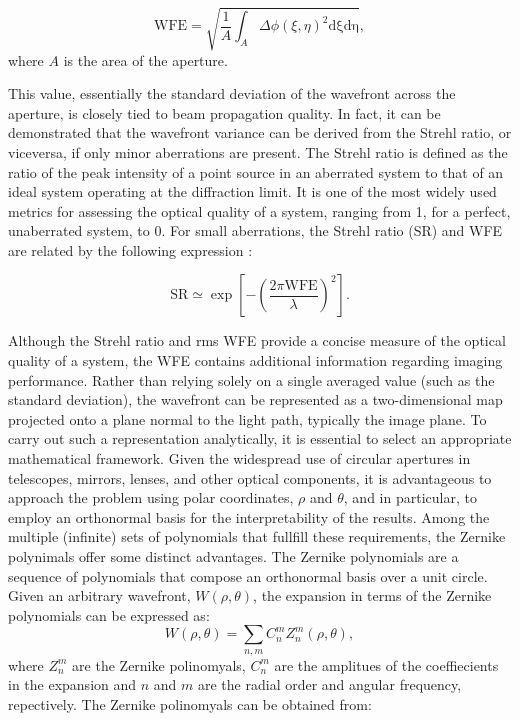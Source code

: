 \begin{equation}
  \textrm{WFE} = \sqrt{\frac{1}{A}\int _ {A} \Delta \phi  \left(\xi, \eta \right) ^2 \mathrm{d \xi}\mathrm{d \eta}},
\end{equation}
where $A$ is the area of the aperture. 

This value, essentially the standard deviation of the wavefront across the aperture, is closely tied to beam propagation quality. In fact, it can be demonstrated that the wavefront variance can be derived from the Strehl ratio, or viceversa, if only minor aberrations are present. The Strehl ratio is defined as the ratio of the peak intensity of a point source in an aberrated system to that of an ideal system operating at the diffraction limit. It is one of the most widely used metrics for assessing the optical quality of a system, ranging from 1, for a perfect, unaberrated system, to 0. For small aberrations, the Strehl ratio (SR) and WFE are related by the following expression \citep{WFE_def}: 

\begin{equation}
  \textrm{SR} \simeq \exp \left[ - \left(\frac{2\pi \textrm{WFE}}{\lambda}\right) ^2 \right].
\end{equation}

Although the Strehl ratio and rms WFE provide a concise measure of the optical quality of a system, the WFE contains additional information regarding imaging performance. Rather than relying solely on a single averaged value (such as the standard deviation), the wavefront can be represented as a two-dimensional map projected onto a plane normal to the light path, typically the image plane. To carry out such a representation analytically, it is essential to select an appropriate mathematical framework. Given the widespread use of circular apertures in telescopes, mirrors, lenses, and other optical components, it is advantageous to approach the problem using polar coordinates, $\rho$ and $\theta$, and in particular, to employ an orthonormal basis for the interpretability of the results. Among the multiple (infinite) sets of polynomials that fullfill these requirements, the Zernike polynimals \citep{Zernike} offer some distinct advantages. The Zernike polynomials are a sequence of polynomials that compose an orthonormal basis over a unit circle. Given an arbitrary wavefront, $W(\rho, \theta)$, the expansion in terms of the Zernike polynomials can be expressed as:
\begin{equation}
  W(\rho, \theta) = \sum_{n, m} C _n ^m Z _ n ^m(\rho, \theta),
\end{equation}
where $Z _n ^m$ are the Zernike polinomyals, $C_n ^m$ are the amplitues of the coeffiecients in the expansion and $n$ and $m$ are the radial order and angular frequency, repectively. The Zernike polinomyals can be obtained from:


